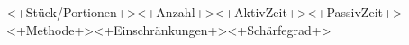 \begin{recipe}{<+Stück/Portionen+>}{<+Anzahl+>}{<+AktivZeit+>}{<+PassivZeit+>}{<+Methode+>}{<+Einschränkungen+>}{<+Schärfegrad+>}
	\label{<+Rezeptname+>}
	\inglist[<+Listenname+>]
	\inglist
	
	\steps
\end{recipe}
